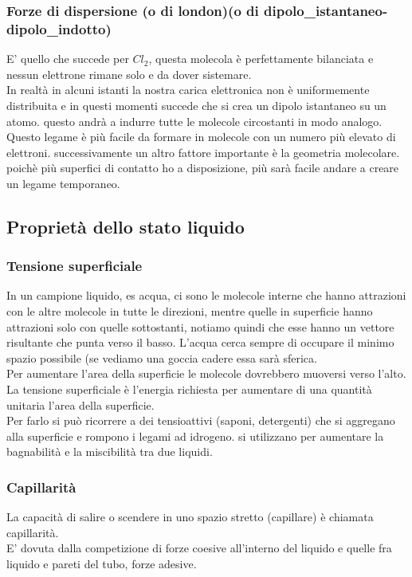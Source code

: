 \subsubsection{Forze di dispersione (o di london)(o di dipolo\_istantaneo-dipolo\_indotto)}
E’ quello che succede per $Cl_2$, questa molecola è perfettamente bilanciata e nessun elettrone rimane solo e da dover sistemare.\\
In realtà in alcuni istanti la nostra carica elettronica non è uniformemente distribuita e in questi momenti succede che si crea un dipolo istantaneo su un atomo. questo andrà a indurre tutte le molecole circostanti in modo analogo.\\
Questo legame è più facile da formare in molecole con un numero più elevato di elettroni. successivamente un altro fattore importante è la geometria molecolare. poichè più superfici di contatto ho a disposizione, più sarà facile andare a creare un legame temporaneo.
\subsection{Proprietà dello stato liquido}
\subsubsection{Tensione superficiale}
In un campione liquido, es acqua, ci sono le molecole interne che hanno attrazioni con le altre molecole in tutte le direzioni, mentre quelle in superficie hanno attrazioni solo con quelle sottostanti, notiamo quindi che esse hanno un vettore risultante che punta verso il basso. L’acqua cerca sempre di occupare il minimo spazio possibile (se vediamo una goccia cadere essa sarà sferica.\\
Per aumentare l’area della superficie le molecole dovrebbero muoversi verso l’alto.\\
La tensione superficiale è l’energia richiesta per aumentare di una quantità unitaria l’area della superficie.\\ 
Per farlo si può ricorrere a dei tensioattivi (saponi, detergenti) che si aggregano alla superficie e rompono i legami ad idrogeno. si utilizzano per aumentare la bagnabilità e la miscibilità tra due liquidi.
\subsubsection{Capillarità}
La capacità di salire o scendere in uno spazio stretto (capillare) è chiamata capillarità. \\
E’ dovuta dalla competizione di forze coesive all’interno del liquido e quelle fra liquido e pareti del tubo, forze adesive. \\
